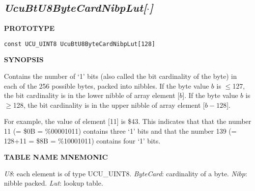 \subsection[\emph{UcuBtU8ByteCardNibpLut[\protect\mbox{\protect$\cdot$}]}]
           {\emph{UcuBtU8ByteCardNibpLut[\protect\mbox{\protect\boldmath $\cdot$}]}}
\label{cbsf0:sctb0:suec0}

%

\noindent\textbf{PROTOTYPE}
\begin {list}{}{\setlength{\leftmargin}{0.25in}\setlength{\topsep}{0.0in}}
\item
\begin{verbatim}
const UCU_UINT8 UcuBtU8ByteCardNibpLut[128]
\end{verbatim}
\end{list}
\vspace{2.8ex}

\noindent\textbf{SYNOPSIS}
\begin{list}{}{\setlength{\leftmargin}{0.25in}\setlength{\topsep}{0.0in}}
\item Contains the number of `1' bits (also called the bit cardinality of the byte)
      in each of the 256 possible bytes, packed
      into nibbles.  If the byte value $b$ is $\leq$127, the 
      bit cardinality is in the lower nibble of array element
      [$b$].  If the byte value $b$ is $\geq$128, the 
      bit cardinality is in the upper nibble of array
      element [$b-128$].
\item For example, the value of element [11] is \$43.  This indicates that that
      the number 11 (= \$0B = \%00001011) contains three `1' bits and that the number
      139 (= 128+11 = \$8B = \%10001011) contains four `1' bits.
\end{list}
\vspace{2.8ex}

\noindent\textbf{TABLE NAME MNEMONIC}
\begin{list}{}{\setlength{\leftmargin}{0.25in}\setlength{\topsep}{0.0in}}
\item \emph{U8}: each element is of type UCU\_UINT8.
      \emph{ByteCard}: cardinality of a byte.
      \emph{Nibp}: nibble packed.
      \emph{Lut}: lookup table.
\end{list}


